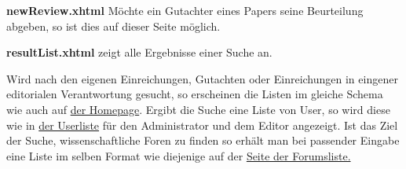 \begin{samepage}
    \textbf{newReview.xhtml} Möchte ein Gutachter eines Papers seine Beurteilung abgeben, so ist dies auf dieser Seite möglich.
    \nopagebreak

\end{samepage}


\begin{samepage}
    \textbf{resultList.xhtml} zeigt alle Ergebnisse einer Suche an.
    \nopagebreak

    Wird nach den eigenen Einreichungen, Gutachten oder Einreichungen in eingener editorialen Verantwortung gesucht, so erscheinen die Listen im gleiche Schema wie auch auf \hyperref[flt:homepage]{der Homepage}.
    Ergibt die Suche eine Liste von User, so wird diese wie in \hyperref[flt:userList]{der Userliste} für den Administrator und dem Editor angezeigt.
    Ist das Ziel der Suche, wissenschaftliche Foren zu finden so erhält man bei passender Eingabe eine Liste im selben Format wie diejenige auf der \hyperref[flt:forumList]{Seite der Forumsliste.}
\end{samepage}


